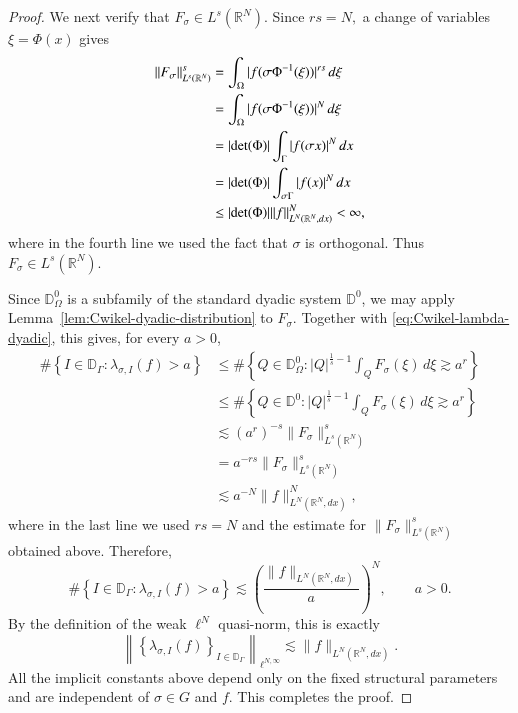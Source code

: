 \documentclass[12pt]{amsart}
\begin{document}
\begin{proof}
We next verify that $F_\sigma\in L^s(\mathbb R^N)$. Since
$
rs=N,
$
a change of variables $\xi=\Phi(x)$ gives
\begin{align*}
\|F_\sigma\|_{L^s(\mathbb R^N)}^s
&=
\int_\Omega
|f(\sigma\Phi^{-1}(\xi))|^{rs}\,d\xi
\\
&=
\int_\Omega
|f(\sigma\Phi^{-1}(\xi))|^N\,d\xi
\\
&=
|{\rm det}(\Phi)|
\int_\Gamma
|f(\sigma x)|^N\,dx
\\
&=
|{\rm det}(\Phi)|
\int_{\sigma\Gamma}
|f(x)|^N\,dx
\\
&\leq
|{\rm det}(\Phi)|
\|f\|_{L^N(\mathbb R^N,dx)}^N
<\infty,
\end{align*}
where in the fourth line we used the fact that $\sigma$ is
orthogonal. Thus
$
F_\sigma\in L^s(\mathbb R^N).
$

Since $\mathbb D_\Omega^0$ is a subfamily of the standard dyadic
system $\mathbb D^0$, we may apply
Lemma~\ref{lem:Cwikel-dyadic-distribution} to $F_\sigma$. Together
with \eqref{eq:Cwikel-lambda-dyadic}, this gives, for every $a>0$,
\begin{align*}
\#\left\{
I\in\mathbb D_\Gamma:
\lambda_{\sigma,I}(f)>a
\right\}
&\leq
\#\left\{
Q\in\mathbb D_\Omega^0:
|Q|^{\frac1s-1}
\int_QF_\sigma(\xi)\,d\xi
\gtrsim a^r
\right\}
\\
&\leq
\#\left\{
Q\in\mathbb D^0:
|Q|^{\frac1s-1}
\int_QF_\sigma(\xi)\,d\xi
\gtrsim a^r
\right\}
\\
&\lesssim
(a^r)^{-s}
\|F_\sigma\|_{L^s(\mathbb R^N)}^s
\\
&=
a^{-rs}
\|F_\sigma\|_{L^s(\mathbb R^N)}^s
\\
&\lesssim
a^{-N}
\|f\|_{L^N(\mathbb R^N,dx)}^N,
\end{align*}
where in the last line we used $rs=N$ and the estimate for
$\|F_\sigma\|_{L^s(\mathbb R^N)}^s$ obtained above. Therefore,
\[
\#\left\{
I\in\mathbb D_\Gamma:
\lambda_{\sigma,I}(f)>a
\right\}
\lesssim
\left(
\frac{\|f\|_{L^N(\mathbb R^N,dx)}}{a}
\right)^N,
\qquad a>0.
\]
By the definition of the weak $\ell^N$ quasi-norm, this is exactly
\[
\left\|
\left\{
\lambda_{\sigma,I}(f)
\right\}_{I\in\mathbb D_\Gamma}
\right\|_{\ell^{N,\infty}}
\lesssim
\|f\|_{L^N(\mathbb R^N,dx)}.
\]
All the implicit constants above depend only on the fixed structural
parameters and are independent of $\sigma\in G$ and $f$. This
completes the proof.
\end{proof}
\end{document}
